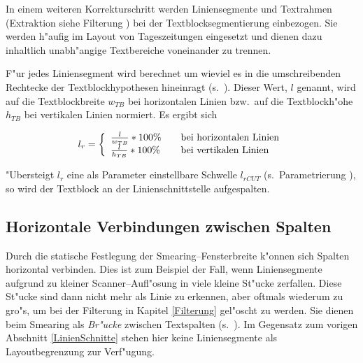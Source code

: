 In einem weiteren Korrekturschritt werden Liniensegmente und Textrahmen
(Extraktion siehe Filterung ) bei der
Textblocksegmentierung einbezogen. Sie werden h"aufig im Layout von Tageszeitungen eingesetzt
und dienen dazu inhaltlich unabh"angige Textbereiche voneinander zu trennen.


F"ur jedes Liniensegment wird berechnet um wieviel es in die umschreibenden Rechtecke der
Textblockhypothesen hineinragt (s.\ ).
Dieser Wert, $l$ genannt, wird auf die Textblockbreite $w_{TB}$
bei horizontalen Linien bzw.\ auf die Textblockh"ohe $h_{TB}$ bei vertikalen Linien normiert.
Es ergibt sich

$$l_r = \left\{
  \begin{array}{l@{\qquad}l}
    \frac{l}{w_{TB}} * 100\% & \mbox{bei horizontalen Linien} \\
    \frac{l}{h_{TB}} * 100\% & \mbox{bei vertikalen Linien}
  \end{array}\right.$$

"Ubersteigt $l_r$ eine als Parameter einstellbare Schwelle $l_{rCUT}$ (s.\ Parametrierung
), so wird der Textblock an der Linienschnittstelle aufgespalten.

\subsection{Horizontale Verbindungen zwischen Spalten}\label{HorKleb}

Durch die statische Festlegung der Smearing--Fensterbreite k"onnen sich Spalten horizontal verbinden. Dies ist zum Beispiel der Fall, wenn Liniensegmente aufgrund zu
kleiner Scanner--Aufl"osung in viele kleine St"ucke zerfallen. Diese St"ucke sind dann nicht mehr als
Linie zu erkennen, aber oftmals wiederum zu gro"s, um bei der Filterung in Kapitel
\ref{Filterung} gel"oscht zu werden. Sie dienen beim Smearing als {\em Br"ucke\/} zwischen
Textspalten (s.\ ). Im Gegensatz zum vorigen Abschnitt \ref{LinienSchnitte}
stehen hier keine Liniensegmente als Layoutbegrenzung zur Verf"ugung.


